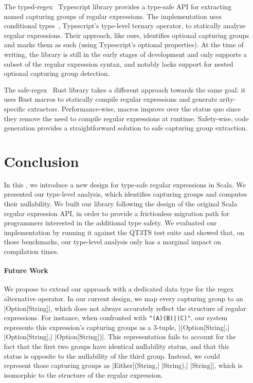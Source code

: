 The typed-regex~\citep{akshay2021typed} Typescript library provides a type-safe API for extracting named capturing groups of regular expressions.
The implementation uses conditional types~\citep{microsoft2020typescript}, Typescript's type-level ternary operator, to statically analyze regular expressions.
Their approach, like ours, identifies optional capturing groups and marks them as such (using Typescript's optional properties).
At the time of writing, the library is still in the early stages of development and only supports a subset of the regular expression syntax, and notably lacks support for nested optional capturing group detection.

The safe-regex~\citep{leonhard2021safe} Rust library takes a different approach towards the same goal: it uses Rust macros to statically compile regular expressions and generate arity-specific extractors.
Performance-wise, macros improve over the status quo since they remove the need to compile regular expressions at runtime.
Safety-wise, code generation provides a straightforward solution to safe capturing group extraction.

\section{Conclusion}
\label{sec:conclusion}

In this \paper, we introduce a new design for type-safe regular expressions in Scala.
We presented our type-level analysis, which identifies capturing groups and computes their nullability.
We built our library following the design of the original Scala regular expression API, in order to provide a frictionless migration path for programmers interested in the additional type safety.
We evaluated our implementation by running it against the QT3TS test suite and showed that, on those benchmarks, our type-level analysis only has a marginal impact on compilation times.

\paragraph{Future Work}
We propose to extend our approach with a dedicated data type for the regex alternative operator.
In our current design, we map every capturing group to an |Option[String]|, which does not always accurately reflect the structure of regular expressions.
For instance, when confronted with \lstinline!"(A)(B)|(C)"!, our system represents this expression's capturing groups as a 3-tuple, |(Option[String],| |Option[String],| |Option[String])|. This representation fails to account for the fact that the first two groups have identical nullability status, and that this status is opposite to the nullability of the third group.
Instead, we could represent those capturing groups as |Either[(String,| |String),| |String]|, which is isomorphic to the structure of the regular expression.
